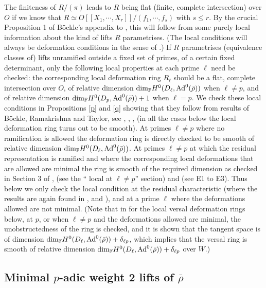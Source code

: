 \documentclass[12pt]{amsart}
\newcommand{\rhobar}{\overline{\rho}}
\newcommand{\Ad}{{\rm Ad}}
\def\rhobar{ {\bar {\rho} } }
\newcommand{\F}{{\mathbb F}}
\begin{document}
The finiteness of $R/(\pi)$ leads to $R$ being  flat (finite, complete intersection) over $ O$ if we know that $R \simeq {O}[[X_1,\cdots,X_r]]/(f_1,\cdots,f_s)$ with $s \leq r$.  By the crucial Proposition 1 of B\"ockle's appendix to \cite{[K03]}, this will follow from some purely local information about the kind of lifts $R$ parametrises. (The local conditions will always be deformation conditions in the sense of \cite{Mazur}.) If $R$ parametrises (equivalence classes of) lifts unramified outside a fixed set of primes, of a certain fixed determinant, only the following local properties at each prime $\ell$ need be checked:  the corresponding local deformation ring $R_{\ell}$ should be a flat, complete intersection  over $O$, of relative dimension 
${\rm dim}{_\F} H^0(D_{\ell},\Ad^0(\rhobar))$ 
when $\ell \neq  p$, and of relative dimension 
${\rm dim}{_\F} H^0(D_{p},\Ad^0(\rhobar))+1$ 
when $\ell =  p$.  We check these local conditions in Propositions \ref{p} and \ref{q} showing that  they follow from results of B\"ockle, Ramakrishna and Taylor, see \cite{Boe}, \cite{Boe1}, \cite{Tay3}, \cite{[R02]} (in all the cases below the local deformation ring turns out to be smooth). At primes $\ell \neq p$ 
where no ramification is allowed the deformation ring is directly checked to be smooth of relative dimension ${\rm dim}{_\F} H^0(D_{\ell},\Ad^0(\rhobar))$. At primes $\ell \neq p$ at which the residual representation is ramified and 
where the corresponding local deformations that are 
allowed are minimal the ring is smooth of the required dimension as checked in Section 3 of \cite{Boe}, \cite{[R02]} (see the 
`` local at $\ell \neq p$'' section) and  \cite{Tay3} (see E1 to E3). 
Thus below we only check the local condition at the residual characteristic 
(where the results are again found in \cite{Boe}, \cite{[R02]} 
and \cite{Tay3}), 
and at a prime $\ell$ where the deformations allowed are not minimal.
(Note that in \cite{Tay3} for the local versal 
deformation rings below, 
at $p$, or when $\ell \neq p$ and the deformations allowed are minimal, 
the unobstructedness of the ring
is checked, and it is shown that the tangent space is of dimension ${\rm dim}{_\F} H^0(D_{\ell},\Ad^0(\rhobar))+\delta_{\ell p}$, which implies that the versal ring is smooth of relative dimension ${\rm dim}{_\F} H^0(D_{\ell},\Ad^0(\rhobar))+\delta_{\ell p}$ over $W$.)

\subsection{Minimal $p$-adic weight 2 
lifts of $\rhobar$}\label{weight2}
\end{document}
